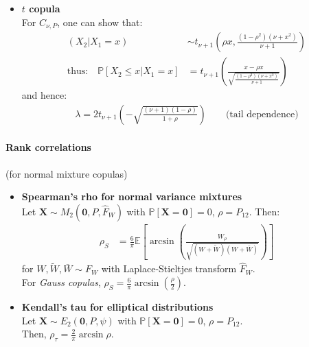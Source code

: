 \documentclass[a4paper,landscape,8pt,fleqn]{scrartcl}
\renewcommand{\emph}[1]{\textbf{#1}}
\begin{document}
\begin{multicols*}{3}
\begin{itemize}
\begin{itemize}
\item \emph{$t$ copula} \\
For $C_{\nu, P}$, one can show that:
\begin{align*}
(X_2 | X_1 = x) &\sim t_{\nu+1} \left( \rho x, \frac{(1-\rho^2)(\nu+x^2)}{\nu+1} \right) \\
\text{thus:} \quad \mathbb{P}[X_2 \leq x | X_1 = x] &= t_{\nu+1} \left( \frac{x-\rho x}{\sqrt{\frac{(1-\rho^2)(\nu+x^2)}{\nu+1}}} \right)
\end{align*}
and hence:
\begin{align*}
\lambda = 2 t_{\nu+1} \left( -\sqrt{\frac{(\nu+1)(1-\rho)}{1+\rho}} \right) \qquad \text{(tail dependence)}
\end{align*}
\end{itemize}
\end{itemize}

\paragraph{Rank correlations} (for normal mixture copulas)
\begin{itemize}
\item \emph{Spearman's rho for normal variance mixtures} \\
Let $\bm X \sim M_2(\bm 0, P, \hat F_W)$ with $\mathbb{P}[\bm X = \bm 0] = 0$, $\rho = P_{12}$. Then:
\begin{align*}
\rho_S &= \frac{6}{\pi} \mathbb{E} \left[ \arcsin \left( \frac{W_\rho}{\sqrt{(W + \tilde W)(W + \bar W)}} \right) \right]
\end{align*}
for $W, \tilde W, \bar W \sim F_W$ with Laplace-Stieltjes transform $\hat F_W$. \\
For \textit{Gauss copulas}, $\rho_S = \frac{6}{\pi} \arcsin \left( \frac{\rho}{2} \right)$.
\item \emph{Kendall's tau for elliptical distributions} \\
Let $\bm X \sim E_2(\bm 0, P, \psi)$ with $\mathbb{P}[\bm X = \bm 0] = 0$, $\rho = P_{12}$. \\
Then, $\rho_\tau = \frac{2}{\pi} \arcsin \rho$.
\end{itemize}


\end{multicols*}
\end{document}
